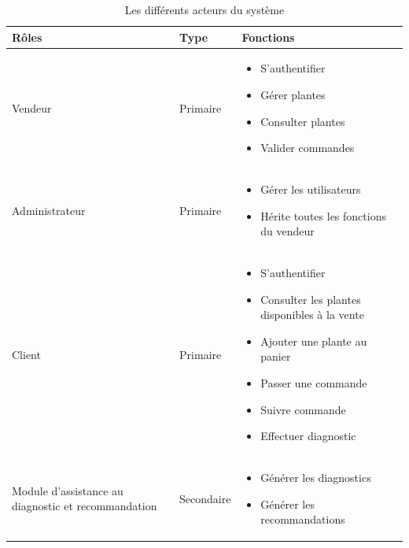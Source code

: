 \begin{table}[H]
\centering
\footnotesize %
\renewcommand{\arraystretch}{1.1}
\begin{tabular}{|p{3.2cm}|p{2.3cm}|p{8.5cm}|}
\hline
\textbf{Rôles} & \textbf{Type} & \textbf{Fonctions} \\
\hline
Vendeur & Primaire &
\vspace{-6pt}
\begin{itemize}
    \item S'authentifier
    \item Gérer plantes
    \item Consulter plantes
    \item Valider commandes
\end{itemize} \\
\hline
Administrateur & Primaire &
\vspace{-6pt}
\begin{itemize}
    \item Gérer les utilisateurs
    \item Hérite toutes les fonctions du vendeur
\end{itemize} \\
\hline
Client & Primaire & 
\vspace{-6pt}
\begin{itemize}
    \item S'authentifier
    \item Consulter les plantes disponibles à la vente
    \item Ajouter une plante au panier
    \item Passer une commande
    \item Suivre commande
    \item Effectuer diagnostic
\end{itemize} \\
\hline
Module d'assistance au diagnostic et recommandation & Secondaire &
\vspace{-6pt}
\begin{itemize}
    \item Générer les diagnostics
    \item Générer les recommandations
\end{itemize} \\
\hline
\end{tabular}
\caption{Les différents acteurs du système}
\label{tableau 0}
\end{table}



\vspace{2cm}
